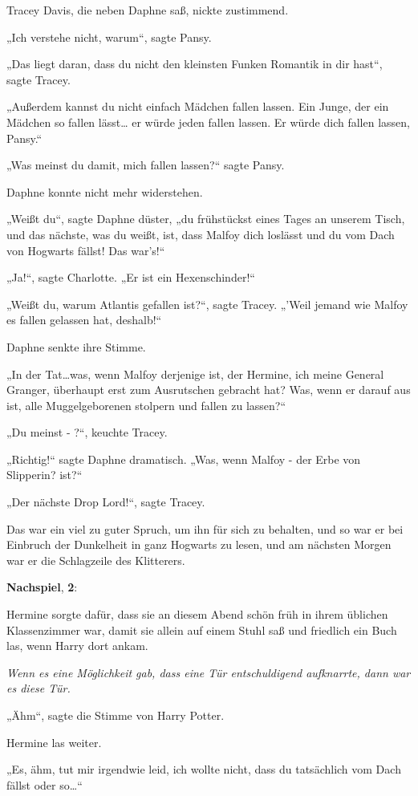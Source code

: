 {Tracey Davis, die neben Daphne saß, nickte zustimmend.

„Ich verstehe nicht, warum“, sagte Pansy.

„Das liegt daran, dass du nicht den kleinsten Funken Romantik in dir hast“, sagte Tracey.

„Außerdem kannst du nicht einfach Mädchen fallen lassen. Ein Junge, der ein Mädchen so fallen lässt… er würde jeden fallen lassen. Er würde dich fallen lassen, Pansy.“

„Was meinst du damit, mich fallen lassen?“ sagte Pansy.

Daphne konnte nicht mehr widerstehen.

„Weißt du“, sagte Daphne düster, „du frühstückst eines Tages an unserem Tisch, und das nächste, was du weißt, ist, dass Malfoy dich loslässt und du vom Dach von Hogwarts fällst! Das war's!“

„Ja!“, sagte Charlotte. „Er ist ein Hexenschinder!“

„Weißt du, warum Atlantis gefallen ist?“, sagte Tracey. „'Weil jemand wie Malfoy es fallen gelassen hat, deshalb!“

Daphne senkte ihre Stimme.

„In der Tat…was, wenn Malfoy derjenige ist, der Hermine, ich meine General Granger, überhaupt erst zum Ausrutschen gebracht hat? Was, wenn er darauf aus ist, alle Muggelgeborenen stolpern und fallen zu lassen?“

„Du meinst - ?“, keuchte Tracey.

„Richtig!“ sagte Daphne dramatisch. „Was, wenn Malfoy - der Erbe von Slipperin? ist?“

„Der nächste Drop Lord!“, sagte Tracey.

Das war ein viel zu guter Spruch, um ihn für sich zu behalten, und so war er bei Einbruch der Dunkelheit in ganz Hogwarts zu lesen, und am nächsten Morgen war er die Schlagzeile des Klitterers.

\textbf{Nachspiel}, \textbf{2}:

Hermine sorgte dafür, dass sie an diesem Abend schön früh in ihrem üblichen Klassenzimmer war, damit sie allein auf einem Stuhl saß und friedlich ein Buch las, wenn Harry dort ankam.

\emph{Wenn es eine Möglichkeit gab, dass eine Tür entschuldigend aufknarrte, dann war es diese Tür.}

„Ähm“, sagte die Stimme von Harry Potter.

Hermine las weiter.

„Es, ähm, tut mir irgendwie leid, ich wollte nicht, dass du tatsächlich vom Dach fällst oder so…“

}
